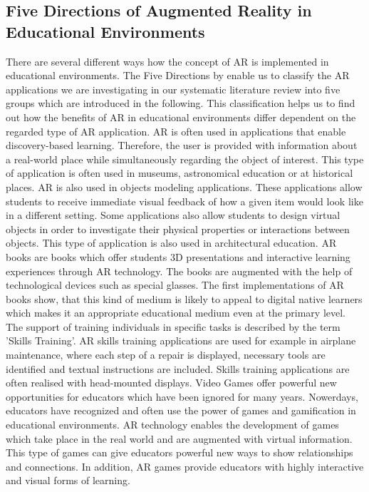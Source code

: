 \subsection{Five Directions of Augmented Reality in Educational Environments}
There are several different ways how the concept of AR is implemented in educational environments. \autocite {Yuen.2011}\mulcit\autocite {Lee.2012} The Five Directions by \cite{Yuen.2011} enable us to classify the AR applications we are investigating in our systematic literature review into five groups which are introduced in the following. This classification helps us to find out how the benefits of AR in educational environments differ dependent on the regarded type of AR application.
AR is often used in applications that enable discovery-based learning. Therefore, the user is provided with information about a real-world place while simultaneously regarding the object of interest. This type of application is often used in museums, astronomical education or at historical places.
AR is also used in objects modeling applications. These applications allow students to receive immediate visual feedback of how a given item would look like in a different setting. Some applications also allow students to design virtual objects in order to investigate their physical properties or interactions between objects. This type of application is also used in architectural education.
AR books are books which offer students 3D presentations and interactive learning experiences through AR technology. The books are augmented with the help of technological devices such as special glasses. The first implementations of AR books show, that this kind of medium is likely to appeal to digital native learners which makes it an appropriate educational medium even at the primary level.
The support of training individuals in specific tasks is described by the term 'Skills Training'. AR skills training applications are used for example in airplane maintenance, where each step of a repair is displayed, necessary tools are identified and textual instructions are included. Skills training applications are often realised with head-mounted displays. 
Video Games offer powerful new opportunities for educators which have been ignored for many years. \autocite{Squire.2003} Nowerdays, educators have recognized and often use the power of games and gamification in educational environments. AR technology enables the development of games which take place in the real world and are augmented with virtual information. This type of games can give educators powerful new ways to show relationships and connections. In addition, AR games provide educators with highly interactive and visual forms of learning.